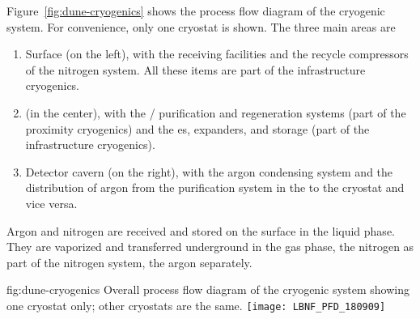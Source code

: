 Figure~\ref{fig:dune-cryogenics} shows the process flow diagram of the
 cryogenic system. For convenience, only one cryostat is shown. The three main areas are 
\begin{enumerate}
  \item Surface (on the left), with the receiving facilities and the
    recycle compressors of the nitrogen system.  All these items are
    part of the infrastructure cryogenics.
  \item
   (in the center), with the /
    purification and regeneration systems (part of the proximity
    cryogenics) and the \coldbox{}es, expanders, and  storage (part of
    the infrastructure cryogenics).
\item Detector cavern (on the right), with the argon condensing system
  and the distribution of argon from the purification system in the
   to the cryostat and vice versa.
\end{enumerate}
Argon and nitrogen are received and stored on the surface in the
liquid phase.  They are vaporized and transferred underground in the
gas phase, the nitrogen as part of the nitrogen system, the argon separately.
\begin{dunefigure}{fig:dune-cryogenics}
  {Overall process flow diagram of the cryogenic system showing one
    cryostat only; other cryostats are the same.}
  \texttt{[image: LBNF\_PFD\_180909]}
\end{dunefigure}


